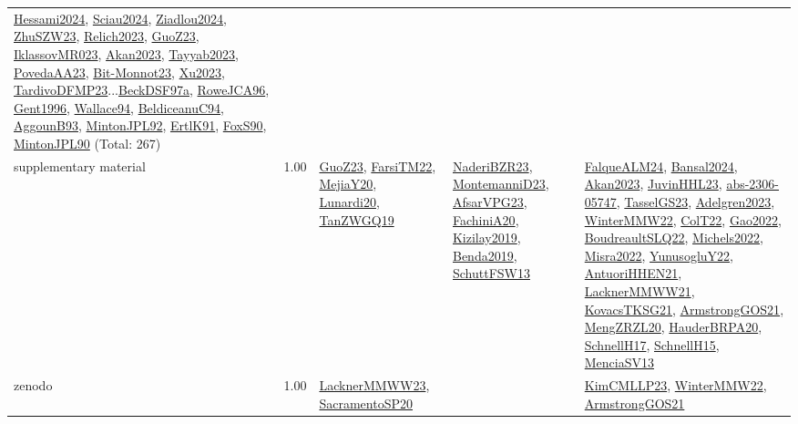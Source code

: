 {\begin{longtable}{p{3cm}r>{\raggedright\arraybackslash}p{6cm}>{\raggedright\arraybackslash}p{6cm}>{\raggedright\arraybackslash}p{8cm}}
\hyperref[detail:Hessami2024]{Hessami2024}, \hyperref[detail:Sciau2024]{Sciau2024}, \hyperref[detail:Ziadlou2024]{Ziadlou2024}, \hyperref[detail:ZhuSZW23]{ZhuSZW23}, \hyperref[detail:Relich2023]{Relich2023}, \hyperref[detail:GuoZ23]{GuoZ23}, \hyperref[detail:IklassovMR023]{IklassovMR023}, \hyperref[detail:Akan2023]{Akan2023}, \hyperref[detail:Tayyab2023]{Tayyab2023}, \hyperref[detail:PovedaAA23]{PovedaAA23}, \hyperref[detail:Bit-Monnot23]{Bit-Monnot23}, \hyperref[detail:Xu2023]{Xu2023}, \hyperref[detail:TardivoDFMP23]{TardivoDFMP23}...\hyperref[detail:BeckDSF97a]{BeckDSF97a}, \hyperref[detail:RoweJCA96]{RoweJCA96}, \hyperref[detail:Gent1996]{Gent1996}, \hyperref[detail:Wallace94]{Wallace94}, \hyperref[detail:BeldiceanuC94]{BeldiceanuC94}, \hyperref[detail:AggounB93]{AggounB93}, \hyperref[detail:MintonJPL92]{MintonJPL92}, \hyperref[detail:ErtlK91]{ErtlK91}, \hyperref[detail:FoxS90]{FoxS90}, \hyperref[detail:MintonJPL90]{MintonJPL90} (Total: 267)\\
\index{supplementary material}\index{Benchmarks!supplementary material}supplementary material &  1.00 & \hyperref[detail:GuoZ23]{GuoZ23}, \hyperref[detail:FarsiTM22]{FarsiTM22}, \hyperref[detail:MejiaY20]{MejiaY20}, \hyperref[detail:Lunardi20]{Lunardi20}, \hyperref[detail:TanZWGQ19]{TanZWGQ19} & \hyperref[detail:NaderiBZR23]{NaderiBZR23}, \hyperref[detail:MontemanniD23]{MontemanniD23}, \hyperref[detail:AfsarVPG23]{AfsarVPG23}, \hyperref[detail:FachiniA20]{FachiniA20}, \hyperref[detail:Kizilay2019]{Kizilay2019}, \hyperref[detail:Benda2019]{Benda2019}, \hyperref[detail:SchuttFSW13]{SchuttFSW13} & \hyperref[detail:FalqueALM24]{FalqueALM24}, \hyperref[detail:Bansal2024]{Bansal2024}, \hyperref[detail:Akan2023]{Akan2023}, \hyperref[detail:JuvinHHL23]{JuvinHHL23}, \hyperref[detail:abs-2306-05747]{abs-2306-05747}, \hyperref[detail:TasselGS23]{TasselGS23}, \hyperref[detail:Adelgren2023]{Adelgren2023}, \hyperref[detail:WinterMMW22]{WinterMMW22}, \hyperref[detail:ColT22]{ColT22}, \hyperref[detail:Gao2022]{Gao2022}, \hyperref[detail:BoudreaultSLQ22]{BoudreaultSLQ22}, \hyperref[detail:Michels2022]{Michels2022}, \hyperref[detail:Misra2022]{Misra2022}, \hyperref[detail:YunusogluY22]{YunusogluY22}, \hyperref[detail:AntuoriHHEN21]{AntuoriHHEN21}, \hyperref[detail:LacknerMMWW21]{LacknerMMWW21}, \hyperref[detail:KovacsTKSG21]{KovacsTKSG21}, \hyperref[detail:ArmstrongGOS21]{ArmstrongGOS21}, \hyperref[detail:MengZRZL20]{MengZRZL20}, \hyperref[detail:HauderBRPA20]{HauderBRPA20}, \hyperref[detail:SchnellH17]{SchnellH17}, \hyperref[detail:SchnellH15]{SchnellH15}, \hyperref[detail:MenciaSV13]{MenciaSV13}\\
\index{zenodo}\index{Benchmarks!zenodo}zenodo &  1.00 & \hyperref[detail:LacknerMMWW23]{LacknerMMWW23}, \hyperref[detail:SacramentoSP20]{SacramentoSP20} &  & \hyperref[detail:KimCMLLP23]{KimCMLLP23}, \hyperref[detail:WinterMMW22]{WinterMMW22}, \hyperref[detail:ArmstrongGOS21]{ArmstrongGOS21}\\
\end{longtable}
}

